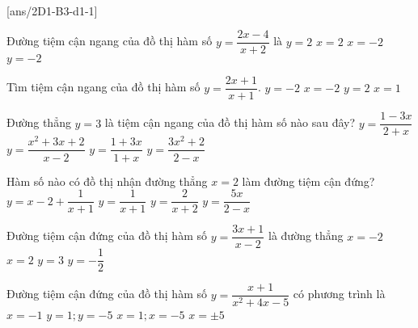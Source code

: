  \\
\setcounter{ex}{0}
[ans/2D1-B3-d1-1]
\begin{ex}
	Đường tiệm cận ngang của đồ thị hàm số $y=\dfrac{2x-4}{x+2}$ là
	\choice
	{\True $y=2$}
	{  $x=2$}
	{ $x=-2$}
	{$y=-2$}
	
\end{ex}
\begin{ex}
	Tìm tiệm cận ngang của đồ thị hàm số $ y = \dfrac{2x + 1}{ x +1} $.
	\choice
	{ \True $  y = -2 $}
	{$  x = -2 $}
	{ $  y = 2 $}
	{$ x = 1 $}
\end{ex}
\begin{ex}
	Đường thẳng $y=3$ là tiệm cận ngang của đồ thị hàm số nào sau đây?
	\choice
	{$y=\dfrac{1-3x}{2+x}$}
	{$y=\dfrac{x^2+3x+2}{x-2}$}
	{\True $y=\dfrac{1+3x}{1+x}$}
	{$y=\dfrac{3x^2+2}{2-x}$}
\end{ex}
\begin{ex}
	Hàm số nào có đồ thị nhận đường thẳng $x = 2$ làm đường tiệm cận đứng?
	\choice
	{$y=x-2+\dfrac{1}{x+1}$}
	{$y=\dfrac{1}{x+1}$}
	{$y=\dfrac{2}{x+2}$}
	{\True $y=\dfrac{5x}{2-x}$}
\end{ex}
\begin{ex}
	Đường tiệm cận đứng của đồ thị hàm số $y=\dfrac{3x+1}{x-2}$ là đường thẳng
	\choice
	{$x=-2$}
	{\True $x=2$}
	{$y=3$}
	{$y=-\dfrac{1}{2}$}
\end{ex}
\begin{ex}
	Đường tiệm cận đứng của đồ thị hàm số $y=\dfrac{x+1}{x^2+4x-5}$ có phương trình là
	\choice
	{$x=-1$}
	{$y=1;y=-5$}
	{\True $x=1;x=-5$}
	{$x=\pm 5$}
\end{ex}
